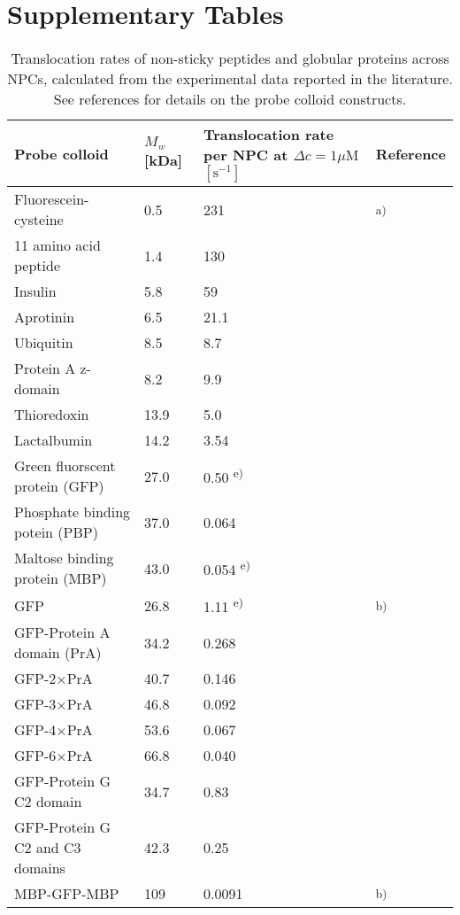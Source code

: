 \documentclass[10pt, a4paper, twocolumn]{article}
\begin{document}
\pagebreak
\onecolumn
\section*{Supplementary Tables}

\begin{table*}[h]
\begin{minipage}{\linewidth}
\centering
\caption{Translocation rates of non-sticky peptides and globular proteins across NPCs, calculated from the experimental data reported in the literature.
See references for details on the probe colloid constructs.}
\label{tbl:inert_probes}
\begin{tabular}{p{6cm}|p{2cm}|p{3.7cm}|p{2cm}}
Probe colloid & $M_w$ [kDa] & Translocation rate per NPC at $\Delta c = 1\mu\text{M}$ $[\text{s}^{-1}]$ & Reference \\
\hline
Fluorescein-cysteine & 0.5 & 231 & \cite{Mohr2009} \textsuperscript{a)} \\
11 amino acid peptide & 1.4 & 130 &  \\
Insulin & 5.8 & 59 &  \\
Aprotinin & 6.5 & 21.1 &  \\
Ubiquitin & 8.5 & 8.7 &  \\
Protein A z-domain & 8.2 & 9.9 &  \\
Thioredoxin & 13.9 & 5.0 &  \\
Lactalbumin & 14.2 & 3.54 &  \\
Green fluorscent protein (GFP) & 27.0 & 0.50 \textsuperscript{e)} &  \\
Phosphate binding potein (PBP) & 37.0 & 0.064 &  \\
Maltose binding protein (MBP) & 43.0 & 0.054 \textsuperscript{e)} &  \\
\hline
GFP & 26.8 & 1.11 \textsuperscript{e)} & \cite{Timney2016} \textsuperscript{b)} \\
GFP-Protein A domain (PrA) & 34.2 & 0.268 &  \\
GFP-2$\times$PrA & 40.7 & 0.146 &  \\
GFP-3$\times$PrA & 46.8 & 0.092 &  \\
GFP-4$\times$PrA & 53.6 & 0.067 &  \\
GFP-6$\times$PrA & 66.8 & 0.040 &  \\
GFP-Protein G C2 domain & 34.7 & 0.83 &  \\
GFP-Protein G C2 and C3 domains & 42.3 & 0.25 &  \\
\hline
MBP-GFP-MBP & 109 & 0.0091 & \cite{Popken2015} \textsuperscript{b)} \\

\end{tabular}
\end{minipage}
\end{table*}
\end{document}
